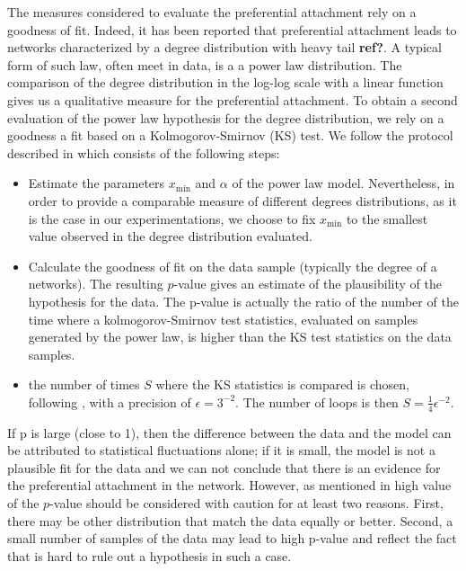 \documentclass[a4paper, 12pt]{article}
\begin{document}
The measures considered to evaluate the preferential attachment rely on a goodness of fit. Indeed, it has been reported that preferential attachment leads to networks characterized by a degree distribution with heavy tail \textbf{ref?}. A typical form of such law, often meet in data, is a a power law distribution. The comparison of the degree distribution in the log-log scale with a linear function gives us a qualitative measure for the preferential attachment. To obtain a second evaluation of the power law hypothesis for the degree distribution, we rely on a  goodness a fit based on a Kolmogorov-Smirnov (KS) test. We follow the protocol described in \cite{clauset2009power} which consists of the following steps:
\begin{itemize}
	\item Estimate the parameters $x_\text{min}$ and $\alpha$ of the power law model. Nevertheless, in order to provide a comparable measure of different degrees distributions, as it is the case in our experimentations, we choose to fix $x_\text{min}$  to the smallest value observed in the degree distribution evaluated.
	\item Calculate the goodness of fit on the data sample (typically the degree of a networks). The resulting $p$-value gives an estimate of the  plausibility of the hypothesis for the data. The p-value is actually the ratio of the number of the time where a kolmogorov-Smirnov test statistics, evaluated on samples generated by the power law, is higher than the KS test statistics on the data samples. 
    \item the number of times $S$ where the KS statistics is compared is chosen, following \cite{clauset2009power}, with a precision of $\epsilon = 3^{-2}$. The  number of loops is then $S = \frac{1}{4}\epsilon^{-2}$.
\end{itemize}

If p is large (close to 1), then the difference between the data and the model can be attributed to statistical fluctuations alone; if it is small, the model is not a plausible fit for the data and we can not conclude that there is an evidence for the preferential attachment in the network. However, as mentioned in \cite{clauset2009power} high value of the $p$-value should be considered with caution for at least two reasons. First, there may be other distribution that match the data equally or better. Second, a small number of samples of the data may lead to high p-value and reflect the fact that is hard to rule out a hypothesis in such a case.
\end{document}
